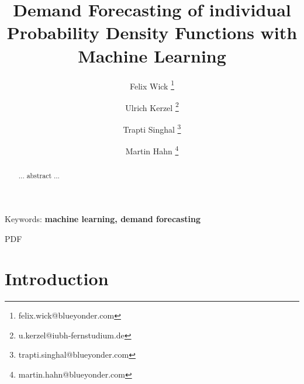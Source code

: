 \documentclass[BCOR=1mm, DIV=calc,10pt,
twoside=true,
twocolumn,
headings=normal]{scrartcl}
\begin{document}
\title{Demand Forecasting of individual Probability Density Functions with Machine Learning}

\author[1]{Felix Wick \thanks{felix.wick@blueyonder.com}}
\author[2]{Ulrich Kerzel \thanks{u.kerzel@iubh-fernstudium.de}}
\author[1]{Trapti Singhal \thanks{trapti.singhal@blueyonder.com}}
\author[1]{Martin Hahn \thanks{martin.hahn@blueyonder.com}}


\date{}

\maketitle

\begin{abstract}
... abstract ...
\end{abstract}

{Keywords: \textbf{machine learning, demand forecasting}}

PDF
\section{Introduction}
\end{document}
